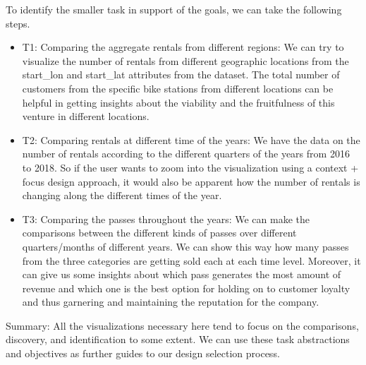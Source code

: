 To identify the smaller task in support of the goals, we can take the following steps.

\begin{itemize}
    \item T1: Comparing the aggregate rentals from different regions:
    We can try to visualize the number of rentals from different geographic locations from the start\_lon and start\_lat attributes from the dataset. The total number of customers from the specific bike stations from different locations can be helpful in getting insights about the viability and the fruitfulness of this venture in different locations.

    \item T2: Comparing rentals at different time of the years:
    We have the data on the number of rentals according to the different quarters of the years from 2016 to 2018. So if the user wants to zoom into the visualization using a context + focus design approach, it would also be apparent how the number of rentals is changing along the different times of the year.

    \item T3: Comparing the passes throughout the years:
    We can make the comparisons between the different kinds of passes over different quarters/months of different years. We can show this way how many passes from the three categories are getting sold each at each time level. Moreover, it can give us some insights about which pass generates the most amount of revenue and which one is the best option for holding on to customer loyalty and thus garnering and maintaining the reputation for the company.
\end{itemize}

Summary: All the visualizations necessary here tend to focus on the comparisons, discovery, and identification to some extent. We can use these task abstractions and objectives as further guides to our design selection process.